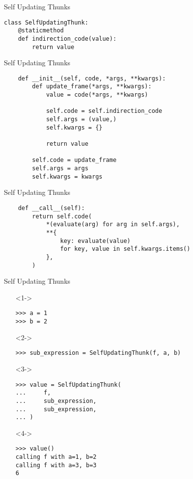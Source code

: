 \documentclass{beamer}
\begin{document}
\begin{frame}[fragile]{Self Updating Thunks}
  \begin{verbatim}
class SelfUpdatingThunk:
    @staticmethod
    def indirection_code(value):
        return value
  \end{verbatim}
\end{frame}

\begin{frame}[fragile]{Self Updating Thunks}
  \begin{verbatim}
    def __init__(self, code, *args, **kwargs):
        def update_frame(*args, **kwargs):
            value = code(*args, **kwargs)

            self.code = self.indirection_code
            self.args = (value,)
            self.kwargs = {}

            return value

        self.code = update_frame
        self.args = args
        self.kwargs = kwargs
  \end{verbatim}
\end{frame}

\begin{frame}[fragile]{Self Updating Thunks}
  \begin{verbatim}
    def __call__(self):
        return self.code(
            *(evaluate(arg) for arg in self.args),
            **{
                key: evaluate(value)
                for key, value in self.kwargs.items()
            },
        )
  \end{verbatim}
\end{frame}

\begin{frame}[fragile]{Self Updating Thunks}
  \begin{itemize}
  \item[]<1-> \begin{verbatim}
>>> a = 1
>>> b = 2
    \end{verbatim}
  \item[]<2-> \begin{verbatim}
>>> sub_expression = SelfUpdatingThunk(f, a, b)
    \end{verbatim}
  \item[]<3-> \begin{verbatim}
>>> value = SelfUpdatingThunk(
...     f,
...     sub_expression,
...     sub_expression,
... )
    \end{verbatim}
  \item[]<4-> \begin{verbatim}
>>> value()
calling f with a=1, b=2
calling f with a=3, b=3
6
    \end{verbatim}
  \end{itemize}
\end{frame}
\end{document}
